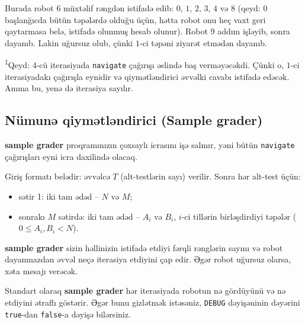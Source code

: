 \documentclass[12pt]{article}
\begin{document}
Burada robot $6$ müxtəlif rəngdən istifadə edib: $0$, $1$, $2$, $3$, $4$ və $8$ (qeyd: $0$ başlanğıcda bütün təpələrdə olduğu üçün, hətta robot onu heç vaxt geri qaytarmasa belə, istifadə olunmuş hesab olunur). Robot $9$ addım işləyib, sonra dayanıb. Lakin uğursuz olub, çünki $1$-ci təpəni ziyarət etmədən dayanıb.

\textsuperscript{1}Qeyd: $4$-cü iterasiyada \texttt{navigate} çağırışı əslində baş verməyəcəkdi. Çünki o, $1$-ci iterasiyadakı çağırışla eynidir və qiymətləndirici əvvəlki cavabı istifadə edəcək. Amma bu, yenə də iterasiya sayılır.

\subsection{Nümunə qiymətləndirici (Sample grader)}

\textbf{sample grader} proqramınızın çoxsaylı icrasını işə salmır, yəni bütün \texttt{navigate} çağırışları eyni icra daxilində olacaq.

Giriş formatı belədir: əvvəlcə $T$ (alt-testlərin sayı) verilir. Sonra hər alt-test üçün:
\begin{itemize}
\item sətir 1: iki tam ədəd – $N$ və $M$;
\item sonrakı $M$ sətirdə: iki tam ədəd – $A_i$ və $B_i$, $i$-ci tillərin birləşdirdiyi təpələr ($0 \leq A_i, B_i < N$).
\end{itemize}

\textbf{sample grader} sizin həllinizin istifadə etdiyi fərqli rənglərin sayını və robot dayanmazdan əvvəl neçə iterasiya etdiyini çap edir. Əgər robot uğursuz olarsa, xəta mesajı verəcək.

Standart olaraq \textbf{sample grader} hər iterasiyada robotun nə gördüyünü və nə etdiyini ətraflı göstərir. Əgər bunu gizlətmək istəsəniz, \texttt{DEBUG} dəyişəninin dəyərini \texttt{true}-dan \texttt{false}-a dəyişə bilərsiniz.
\end{document}

